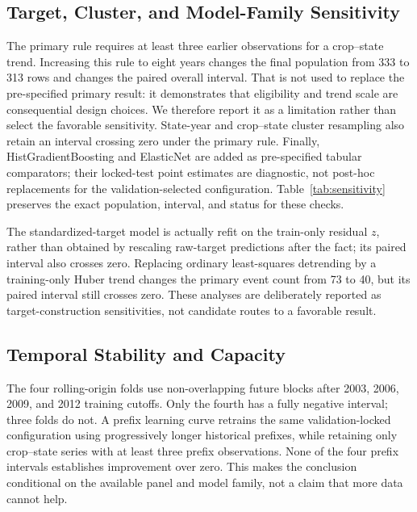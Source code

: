 \documentclass[conference]{IEEEtran}
\begin{document}
\begin{table}[t]
\centering
\caption{Robustness and protocol sensitivity. Complete row-level outputs and
settings are included in the audit artifact.}
\label{tab:robustness}
\scriptsize
\resizebox{\columnwidth}{!}{}
\end{table}

\subsection{Target, Cluster, and Model-Family Sensitivity}
The primary rule requires at least three earlier observations for a crop--state
trend. Increasing this rule to eight years changes the final population from 333
to 313 rows and changes the paired overall interval. That is not used to replace
the pre-specified primary result: it demonstrates that eligibility and trend scale
are consequential design choices. We therefore report it as a limitation rather
than select the favorable sensitivity. State-year and crop--state cluster resampling
also retain an interval crossing zero under the primary rule. Finally,
HistGradientBoosting and ElasticNet are added as pre-specified tabular comparators;
their locked-test point estimates are diagnostic, not post-hoc replacements for the
validation-selected configuration. Table~\ref{tab:sensitivity} preserves the exact
population, interval, and status for these checks.

\begin{table}[t]
\centering
\caption{Target, cluster, and expanded-model sensitivity. History 3 is the
primary pre-specified eligibility rule; later history rules are not used to change
selection or the primary claim.}
\label{tab:sensitivity}
\scriptsize
\resizebox{\textwidth}{!}{}
\end{table}

The standardized-target model is actually refit on the train-only residual $z$,
rather than obtained by rescaling raw-target predictions after the fact; its paired
interval also crosses zero. Replacing ordinary least-squares detrending by a
training-only Huber trend changes the primary event count from 73 to 40, but its
paired interval still crosses zero. These analyses are deliberately reported as
target-construction sensitivities, not candidate routes to a favorable result.

\subsection{Temporal Stability and Capacity}
The four rolling-origin folds use non-overlapping future blocks after 2003, 2006,
2009, and 2012 training cutoffs. Only the fourth has a fully negative interval;
three folds do not. A prefix learning curve retrains the same validation-locked
configuration using progressively longer historical prefixes, while retaining only
crop--state series with at least three prefix observations. None of the four
prefix intervals establishes improvement over zero. This makes the conclusion
conditional on the available panel and model family, not a claim that more data
cannot help.
\end{document}
